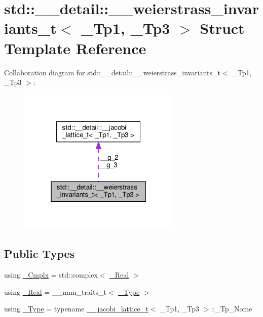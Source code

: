\hypertarget{structstd_1_1____detail_1_1____weierstrass__invariants__t}{}\section{std\+:\+:\+\_\+\+\_\+detail\+:\+:\+\_\+\+\_\+weierstrass\+\_\+invariants\+\_\+t$<$ \+\_\+\+Tp1, \+\_\+\+Tp3 $>$ Struct Template Reference}
\label{structstd_1_1____detail_1_1____weierstrass__invariants__t}


Collaboration diagram for std\+:\+:\+\_\+\+\_\+detail\+:\+:\+\_\+\+\_\+weierstrass\+\_\+invariants\+\_\+t$<$ \+\_\+\+Tp1, \+\_\+\+Tp3 $>$\+:
\nopagebreak
\begin{figure}[H]
\begin{center}
\leavevmode
\includegraphics[width=220pt]{structstd_1_1____detail_1_1____weierstrass__invariants__t__coll__graph}
\end{center}
\end{figure}
\subsection*{Public Types}
\begin{DoxyCompactItemize}
\item 
using \hyperlink{structstd_1_1____detail_1_1____weierstrass__invariants__t_a611ce9f1f3676ff9615d4205b6115528}{\+\_\+\+Cmplx} = std\+::complex$<$ \hyperlink{structstd_1_1____detail_1_1____weierstrass__invariants__t_a7990bba8f3b3d155a80d051c86de1460}{\+\_\+\+Real} $>$
\item 
using \hyperlink{structstd_1_1____detail_1_1____weierstrass__invariants__t_a7990bba8f3b3d155a80d051c86de1460}{\+\_\+\+Real} = \+\_\+\+\_\+num\+\_\+traits\+\_\+t$<$ \hyperlink{structstd_1_1____detail_1_1____weierstrass__invariants__t_a9992ab3f07a514203487c0760d76173f}{\+\_\+\+Type} $>$
\item 
using \hyperlink{structstd_1_1____detail_1_1____weierstrass__invariants__t_a9992ab3f07a514203487c0760d76173f}{\+\_\+\+Type} = typename \hyperlink{structstd_1_1____detail_1_1____jacobi__lattice__t}{\+\_\+\+\_\+jacobi\+\_\+lattice\+\_\+t}$<$ \+\_\+\+Tp1, \+\_\+\+Tp3 $>$\+::\+\_\+\+Tp\+\_\+\+Nome
\end{DoxyCompactItemize}
